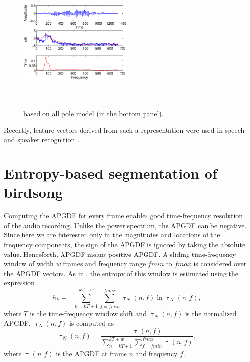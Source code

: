 \documentclass[a4paper]{article}
\begin{document}
\begin{figure}[h]
\centering
\includegraphics[width=0.5\textwidth,height=7cm]
{apgd.eps}
\caption{based on all pole model (in the bottom panel).}
\label{fig:all-pole}
\end{figure}


Recently, feature vectors
derived from such a representation were used in speech \cite{drugman} and speaker
recognition \cite{padman}. 









\section{Entropy-based segmentation of birdsong}

Computing the APGDF for every frame enables good time-frequency resolution of
the audio recording. Unlike the power spectrum, the APGDF can be negative.
Since here we are interested only in the magnitudes and locations of the
frequency components, the sign of the APGDF is ignored by taking the absolute
value. Henceforth, APGDF means positive APGDF.  A sliding time-frequency window
of width $w$ frames and frequency range $fmin$ to $fmax$ is considered over the
APGDF vectors. As in \cite{wang2013}, the entropy of this window is estimated
using the expression
\begin{equation}
h_{k}=-\sum_{n=kT+1}^{kT+w}\sum_{f=fmin}^{fmax} \uptau_N(n,f) \ln \uptau_N(n,f),
\end{equation}
where $T$ is the time-frequency window shift and $\uptau_N(n,f)$ is the
normalized APGDF. $\uptau_N(n,f)$ is computed as 
\begin{equation}
\uptau_N(n,f)=\frac {\uptau(n,f)}
{\sum_{n=kT+1}^{kT+w}\sum_{f=fmin}^{fmax} \uptau(n,f)},
\end{equation}
where $\uptau(n,f)$ is the APGDF at frame $n$ and frequency $f$.
\end{document}
